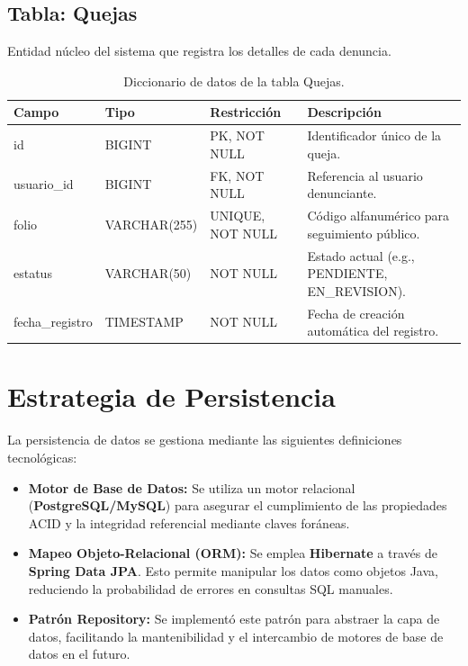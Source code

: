 \subsection{Tabla: Quejas}
Entidad núcleo del sistema que registra los detalles de cada denuncia.

\begin{table}[htbp]
\centering
\small
\begin{tabular}{|l|l|l|p{6cm}|}
\hline
\rowcolor[HTML]{EFEFEF} 
\textbf{Campo} & \textbf{Tipo} & \textbf{Restricción} & \textbf{Descripción} \\ \hline
id & BIGINT & PK, NOT NULL & Identificador único de la queja. \\ \hline
usuario\_id & BIGINT & FK, NOT NULL & Referencia al usuario denunciante. \\ \hline
folio & VARCHAR(255) & UNIQUE, NOT NULL & Código alfanumérico para seguimiento público. \\ \hline
estatus & VARCHAR(50) & NOT NULL & Estado actual (e.g., PENDIENTE, EN\_REVISION). \\ \hline
fecha\_registro & TIMESTAMP & NOT NULL & Fecha de creación automática del registro. \\ \hline
\end{tabular}
\caption{Diccionario de datos de la tabla Quejas.}
\end{table}

\section{Estrategia de Persistencia}
La persistencia de datos se gestiona mediante las siguientes definiciones tecnológicas:
\begin{itemize}
    \item \textbf{Motor de Base de Datos:} Se utiliza un motor relacional (\textbf{PostgreSQL/MySQL}) para asegurar el cumplimiento de las propiedades ACID y la integridad referencial mediante claves foráneas.
    \item \textbf{Mapeo Objeto-Relacional (ORM):} Se emplea \textbf{Hibernate} a través de \textbf{Spring Data JPA}. Esto permite manipular los datos como objetos Java, reduciendo la probabilidad de errores en consultas SQL manuales.
    \item \textbf{Patrón Repository:} Se implementó este patrón para abstraer la capa de datos, facilitando la mantenibilidad y el intercambio de motores de base de datos en el futuro.
\end{itemize}

